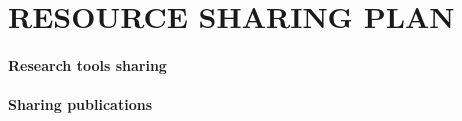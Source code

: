 \documentclass[11pt,letterpaper]{article}
\begin{document}
\section{RESOURCE SHARING PLAN}

\paragraph{Research tools sharing}

\paragraph{Sharing publications}
\end{document}
